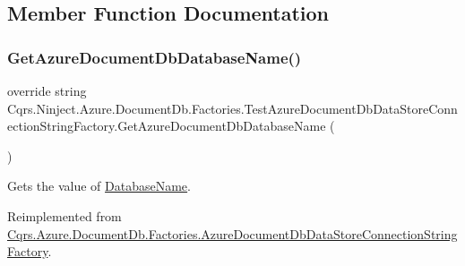 \subsection{Member Function Documentation}
\mbox{\label{classCqrs_1_1Ninject_1_1Azure_1_1DocumentDb_1_1Factories_1_1TestAzureDocumentDbDataStoreConnectionStringFactory_ab4b864396b790819609d3337dfb3f75d_ab4b864396b790819609d3337dfb3f75d}} 
\subsubsection{\texorpdfstring{Get\+Azure\+Document\+Db\+Database\+Name()}{GetAzureDocumentDbDatabaseName()}}
{\footnotesize\ttfamily override string Cqrs.\+Ninject.\+Azure.\+Document\+Db.\+Factories.\+Test\+Azure\+Document\+Db\+Data\+Store\+Connection\+String\+Factory.\+Get\+Azure\+Document\+Db\+Database\+Name (\begin{DoxyParamCaption}{ }\end{DoxyParamCaption})\hspace{0.3cm}{\ttfamily [virtual]}}



Gets the value of \hyperlink{classCqrs_1_1Ninject_1_1Azure_1_1DocumentDb_1_1Factories_1_1TestAzureDocumentDbDataStoreConnectionStringFactory_ae0da37bd91333ad782058d32d4de2594_ae0da37bd91333ad782058d32d4de2594}{Database\+Name}. 



Reimplemented from \hyperlink{classCqrs_1_1Azure_1_1DocumentDb_1_1Factories_1_1AzureDocumentDbDataStoreConnectionStringFactory_a2a30d6066e2bc9c4af078b1f0a5407ab_a2a30d6066e2bc9c4af078b1f0a5407ab}{Cqrs.\+Azure.\+Document\+Db.\+Factories.\+Azure\+Document\+Db\+Data\+Store\+Connection\+String\+Factory}.

